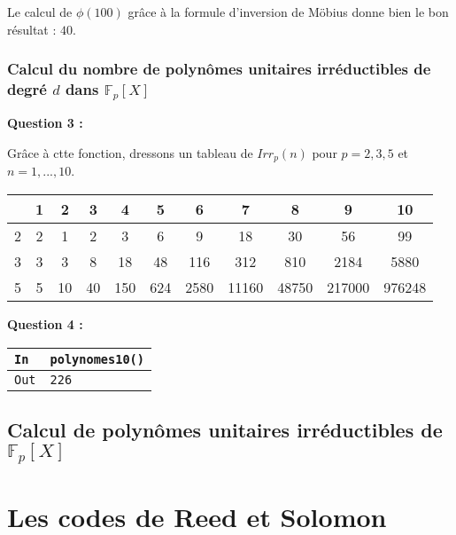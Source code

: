 \documentclass[titlepage]{article}
\begin{document}
            Le calcul de $\phi (100)$ grâce à la formule d'inversion de Möbius donne bien le bon résultat : $40$.

            \subsubsection{Calcul du nombre de polynômes unitaires irréductibles de degré $d$ dans $\mathbb{F}_p[X]$}
            \textbf{Question 3 :}
            
            Grâce à ctte fonction, dressons un tableau de $Irr_p(n)$ pour $p = 2, 3, 5$ et $n = 1, . . . , 10$.

            \begin{tabular}{|c|c c c c c c c c c c|}
                \hline
                & 1 & 2 & 3 & 4 & 5 & 6 & 7 & 8 & 9 & 10 \\
                \hline
                2 & 2 & 1 & 2 & 3 & 6 & 9 & 18 & 30 & 56 & 99 \\
                3 & 3 & 3 & 8 & 18 & 48 & 116 & 312 & 810 & 2184 & 5880 \\
                5 & 5 & 10 & 40 & 150 & 624 & 2580 & 11160 &  48750 & 217000 & 976248 \\ 
                \hline
            \end{tabular}
            \bigbreak

            \textbf{Question 4 :}
            

            \begin{tabularx}{12cm}{|p{0.60cm}|X|}
                \hline
                \rowcolor{gray}
                \texttt{In}
                & 
                \texttt{polynomes10()}
                \\
                \hline
                \texttt{Out}
                &
                \texttt{226}
                \\
                \hline
            \end{tabularx}
            \bigbreak

        \subsection{Calcul de polynômes unitaires irréductibles de $\mathbb{F}_p[X]$}
    
    \section{Les codes de Reed et Solomon}
\end{document}
